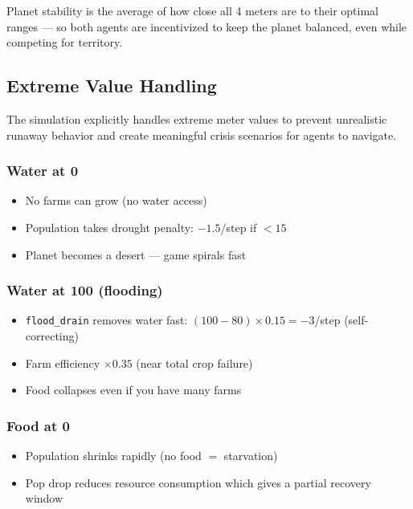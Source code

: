 \documentclass[12pt,a4paper]{article}
\begin{document}
Planet stability is the average of how close all 4 meters are to their optimal ranges --- so both agents are incentivized to keep the planet balanced, even while competing for territory.

\subsection{Extreme Value Handling}

The simulation explicitly handles extreme meter values to prevent unrealistic runaway behavior and create meaningful crisis scenarios for agents to navigate.

\subsubsection*{Water at 0}
\begin{itemize}[leftmargin=1.5cm]
    \item No farms can grow (no water access)
    \item Population takes drought penalty: $-1.5$/step if $< 15$
    \item Planet becomes a desert --- game spirals fast
\end{itemize}

\subsubsection*{Water at 100 (flooding)}
\begin{itemize}[leftmargin=1.5cm]
    \item \texttt{flood\_drain} removes water fast: $(100 - 80) \times 0.15 = -3$/step (self-correcting)
    \item Farm efficiency $\times 0.35$ (near total crop failure)
    \item Food collapses even if you have many farms
\end{itemize}

\subsubsection*{Food at 0}
\begin{itemize}[leftmargin=1.5cm]
    \item Population shrinks rapidly (no food $=$ starvation)
    \item Pop drop reduces resource consumption which gives a partial recovery window
\end{itemize}
\end{document}
